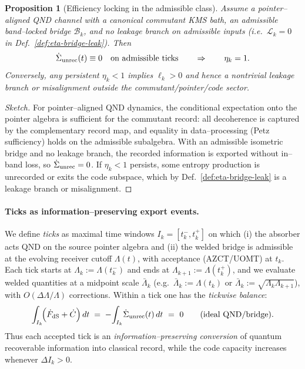 \documentclass[10pt]{article}
\theoremstyle{definition}
\theoremstyle{plain}
\newtheorem{proposition}{Proposition}[section]
\begin{document}
\begin{proposition}[Efficiency locking in the admissible class]\label{prop:eta-lock}
Assume a pointer--aligned QND channel with a canonical commutant KMS bath, an admissible
band--locked bridge $\mathcal B_k$, and no leakage branch on admissible inputs
(i.e.\ $\mathcal L_k=0$ in Def.~\ref{def:eta-bridge-leak}). Then
\[
\dot{\Sigma}_{\rm unrec}(t)\equiv 0\quad\text{on admissible ticks}\qquad\Rightarrow\qquad \eta_k=1.
\]
Conversely, any persistent $\eta_k<1$ implies $\ell_k>0$ and hence a nontrivial leakage
branch or misalignment outside the commutant/pointer/code sector.
\end{proposition}

\begin{proof}[Sketch]
For pointer--aligned QND dynamics, the conditional expectation onto the pointer algebra is
sufficient for the commutant record: all decoherence is captured by the complementary
record map, and equality in data--processing (Petz sufficiency) holds on the admissible
subalgebra. With an admissible isometric bridge and no leakage branch, the recorded
information is exported without in--band loss, so $\dot{\Sigma}_{\rm unrec}=0$.
If $\eta_k<1$ persists, some entropy production is unrecorded or exits the code subspace,
which by Def.~\ref{def:eta-bridge-leak} is a leakage branch or misalignment.
\end{proof}

\paragraph{Ticks as information–preserving export events.}\label{par:uom-main-018}
We define \emph{ticks} as maximal time windows $I_k=[t_k^- ,t_k^+]$ on which (i) the
absorber acts QND on the source pointer algebra and (ii) the welded bridge is
admissible at the evolving receiver cutoff $\Lambda(t)$, with acceptance (AZCT/UOMT)
at $t_k$. Each tick starts at $\Lambda_k:=\Lambda(t_k^-)$ and ends at
$\Lambda_{k+1}:=\Lambda(t_k^+)$, and we evaluate welded quantities at a midpoint
scale $\bar\Lambda_k$ (e.g.\ $\bar\Lambda_k:=\Lambda(t_k)$ or
$\bar\Lambda_k:=\sqrt{\Lambda_k\Lambda_{k+1}}$), with $O(\Delta\Lambda/\Lambda)$
corrections. Within a tick one has the \emph{tickwise balance}:
\[
\int_{I_k}\!\!\Big(\dot F_{\rm dS}+\dot C\Big)\,dt
\;=\;-\!\int_{I_k}\!\dot{\Sigma}_{\rm unrec}(t)\,dt\ =\ 0\qquad\text{(ideal QND/bridge).}
\]
Thus each accepted tick is an \emph{information–preserving conversion} of quantum
recoverable information into classical record, while the code capacity increases
whenever $\Delta I_k>0$.
\end{document}
